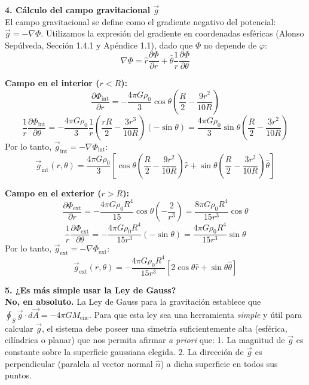 \documentclass[a4paper]{article}
\begin{document}
\vspace{0.3cm}
\noindent\textbf{4. Cálculo del campo gravitacional $\vec{g}$} \\
El campo gravitacional se define como el gradiente negativo del potencial: $\vec{g} = -\nabla \Phi$. Utilizamos la expresión del gradiente en coordenadas esféricas (Alonso Sepúlveda, Sección 1.4.1 y Apéndice 1.1), dado que $\Phi$ no depende de $\varphi$:
$$
\nabla \Phi = \hat{r} \frac{\partial \Phi}{\partial r} + \hat{\theta} \frac{1}{r} \frac{\partial \Phi}{\partial \theta}
$$

\textbf{Campo en el interior ($r < R$):}
$$
\frac{\partial \Phi_{\text{int}}}{\partial r} = -\frac{4\pi G \rho_0}{3} \cos\theta \left( \frac{R}{2} - \frac{9r^2}{10R} \right)
$$
$$
\frac{1}{r} \frac{\partial \Phi_{\text{int}}}{\partial \theta} = -\frac{4\pi G \rho_0}{3} \frac{1}{r} \left( \frac{r R}{2} - \frac{3r^3}{10R} \right) (-\sin\theta) = \frac{4\pi G \rho_0}{3} \sin\theta \left( \frac{R}{2} - \frac{3r^2}{10R} \right)
$$
Por lo tanto, $\vec{g}_{\text{int}} = -\nabla \Phi_{\text{int}}$:
$$
\vec{g}_{\text{int}}(r, \theta) = \frac{4\pi G \rho_0}{3} \left[ \cos\theta \left( \frac{R}{2} - \frac{9r^2}{10R} \right) \hat{r} + \sin\theta \left( \frac{R}{2} - \frac{3r^2}{10R} \right) \hat{\theta} \right]
$$

\textbf{Campo en el exterior ($r > R$):}
$$
\frac{\partial \Phi_{\text{ext}}}{\partial r} = -\frac{4\pi G \rho_0 R^4}{15} \cos\theta \left( -\frac{2}{r^3} \right) = \frac{8\pi G \rho_0 R^4}{15 r^3} \cos\theta
$$
$$
\frac{1}{r} \frac{\partial \Phi_{\text{ext}}}{\partial \theta} = -\frac{4\pi G \rho_0 R^4}{15 r^3} (-\sin\theta) = \frac{4\pi G \rho_0 R^4}{15 r^3} \sin\theta
$$
Por lo tanto, $\vec{g}_{\text{ext}} = -\nabla \Phi_{\text{ext}}$:
$$
\vec{g}_{\text{ext}}(r, \theta) = -\frac{4\pi G \rho_0 R^4}{15 r^3} \left[ 2\cos\theta \hat{r} + \sin\theta \hat{\theta} \right]
$$

\vspace{0.3cm}
\noindent\textbf{5. ¿Es más simple usar la Ley de Gauss?} \\
\textbf{No, en absoluto.} La Ley de Gauss para la gravitación establece que $\oint_S \vec{g} \cdot d\vec{A} = -4\pi G M_{\text{enc}}$. 
Para que esta ley sea una herramienta \textit{simple} y útil para calcular $\vec{g}$, el sistema debe poseer una simetría suficientemente alta (esférica, cilíndrica o planar) que nos permita afirmar \textit{a priori} que:
1. La magnitud de $\vec{g}$ es constante sobre la superficie gaussiana elegida.
2. La dirección de $\vec{g}$ es perpendicular (paralela al vector normal $\hat{n}$) a dicha superficie en todos sus puntos.
\end{document}
